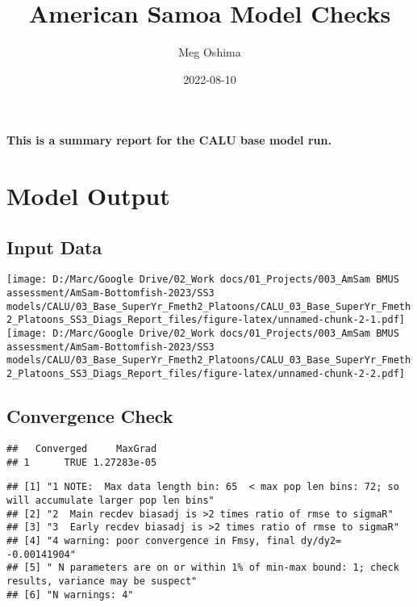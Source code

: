 \documentclass[
]{article}
\title{American Samoa Model Checks}
\author{Meg Oshima}
\date{2022-08-10}
\begin{document}
\maketitle

\textbf{This is a summary report for the CALU base model run.}

\hypertarget{model-output}{%
\section{Model Output}\label{model-output}}

\hypertarget{input-data}{%
\subsection{Input Data}\label{input-data}}

\texttt{[image: D:/Marc/Google Drive/02\_Work docs/01\_Projects/003\_AmSam BMUS assessment/AmSam-Bottomfish-2023/SS3 models/CALU/03\_Base\_SuperYr\_Fmeth2\_Platoons/CALU\_03\_Base\_SuperYr\_Fmeth2\_Platoons\_SS3\_Diags\_Report\_files/figure-latex/unnamed-chunk-2-1.pdf]}
\texttt{[image: D:/Marc/Google Drive/02\_Work docs/01\_Projects/003\_AmSam BMUS assessment/AmSam-Bottomfish-2023/SS3 models/CALU/03\_Base\_SuperYr\_Fmeth2\_Platoons/CALU\_03\_Base\_SuperYr\_Fmeth2\_Platoons\_SS3\_Diags\_Report\_files/figure-latex/unnamed-chunk-2-2.pdf]}

\hypertarget{convergence-check}{%
\subsection{Convergence Check}\label{convergence-check}}

\begin{verbatim}
##   Converged     MaxGrad
## 1      TRUE 1.27283e-05
\end{verbatim}

\begin{verbatim}
## [1] "1 NOTE:  Max data length bin: 65  < max pop len bins: 72; so will accumulate larger pop len bins"
## [2] "2  Main recdev biasadj is >2 times ratio of rmse to sigmaR"                                      
## [3] "3  Early recdev biasadj is >2 times ratio of rmse to sigmaR"                                     
## [4] "4 warning: poor convergence in Fmsy, final dy/dy2= -0.00141904"                                  
## [5] " N parameters are on or within 1% of min-max bound: 1; check results, variance may be suspect"   
## [6] "N warnings: 4"
\end{verbatim}
\end{document}
